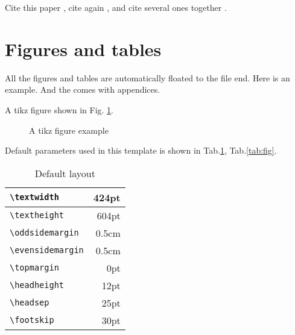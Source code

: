 \documentclass{kuee_en}
\begin{document}
Cite this paper \cite{Kiyohara2020}, cite again \cite{Okano2015}, and cite several ones together \cite{Nagata2007, Sugiura2019}.

\section{Figures and tables}
All the figures and tables are automatically floated to the file end. Here is an example. And the comes with appendices.

A tikz figure shown in Fig. \ref{fig:tikz}.

\begin{figure}
    \centering
  \caption{A tikz figure example}
  \label{fig:tikz}
\end{figure}

Default parameters used in this template is shown in Tab.\ref{tab:text}, Tab.\ref{tab:fig}.

\begin{table}
  \caption{Default layout}\label{tab:text}
  \begin{center}
    \begin{tabular}{|l|r|}
      \hline
      \verb+\textwidth+ & 424pt \\ \hline
      \verb+\textheight+ & 604pt \\ \hline
      \verb+\oddsidemargin+ & 0.5cm \\ \hline
      \verb+\evensidemargin+ & 0.5cm \\ \hline
      \verb+\topmargin+ & 0pt \\ \hline
      \verb+\headheight+ &12pt \\ \hline
      \verb+\headsep+ & 25pt \\ \hline
      \verb+\footskip+ & 30pt \\ \hline
    \end{tabular}
  \end{center}
\end{table}
\end{document}

